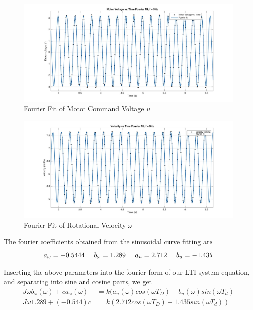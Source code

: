 \documentclass[11pt,titlepage]{article}
\begin{document}
	\begin{figure}[h!]
		\centering
		\includegraphics[trim={6cm 0 0 0},clip,angle=0,origin=c,scale=0.3]{fourier_volt_5Hz}
		\caption{Fourier Fit of Motor Command Voltage $u$}
		\label{fig:fourier_volt_5Hz}
	\end{figure}
	
	\begin{figure}[h!]
		\centering
		\includegraphics[trim={6cm 0 0 0},clip,angle=0,origin=c,scale=0.3]{fourier_vel_5Hz}
		\caption{Fourier Fit of Rotational Velocity $\omega$}
		\label{fig:fourier_vel_5Hz}
	\end{figure}
	
	The fourier coefficients obtained from the sinusoidal curve fitting are
	\begin{equation}
		a_{\omega}=-0.5444\hspace{0.5cm}b_{\omega}=1.289\hspace{0.5cm}a_u=2.712\hspace{0.5cm}b_u=-1.435\nonumber
	\end{equation}
	
	Inserting the above parameters into the fourier form of our LTI system equation, and separating into sine and cosine parts, we get
	\begin{align}
		J\omega b_{\omega}(\omega)+ca_{\omega}(\omega)&=k(a_u(\omega)cos(\omega T_D)-b_u(\omega)sin(\omega T_d)\\
		J\omega 1.289+(-0.544)c&=k(2.712cos(\omega T_D)+1.435sin(\omega T_d))
	\end{align}
\end{document}

